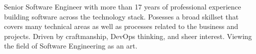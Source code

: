 
Senior Software Engineer with more than 17 years of professional experience building software across the technology stack.
Posesses a broad skillset that covers many technical areas as well as processes related to the business and projects.
Driven by craftmanship, DevOps thinking, and sheer interest. Viewing the field of Software Engineering as an art.
